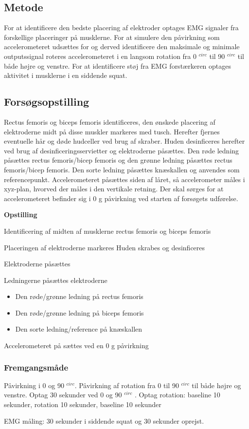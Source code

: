\subsection{Metode}
\begin{itemize}
For at identificere den bedste placering af elektroder optages EMG signaler fra forskellige placeringer på musklerne. 
For at simulere den påvirkning som accelerometeret udsættes for og derved identificere den maksimale og minimale outputssignal roteres accelerometeret i en langsom rotation fra 0 $^{circ}$ til 90 $^{circ}$  til både højre og venstre.
For at identificere støj fra EMG forstærkeren optages aktivitet i musklerne i en siddende squat.
 
\end{itemize}
\subsection{Forsøgsopstilling}
Rectus femoris og biceps femoris identificeres, den ønskede placering af elektroderne midt på disse muskler markeres med tusch. Herefter fjernes eventuelle hår og døde hudceller ved brug af skraber. Huden desinficeres herefter ved brug af desinficeringsservietter og elektroderne påsættes. Den røde ledning påsættes rectus femoris/bicep femoris og den grønne ledning påsættes rectus femoris/bicep femoris. Den sorte ledning påsættes knæskallen og anvendes som referencepunkt. Accelerometeret påsættes siden af låret, så accelerometer måles i xyz-plan, hvorved der måles i den vertikale retning. Der skal sørges for at accelerometeret befinder sig i 0 g påvirkning ved starten af forsøgets udførelse. 

\textbf{Opstilling}
\item Identificering af midten af musklerne rectus femoris og biceps femoris 
\item Placeringen af elektroderne markeres
 Huden skrabes og desinficeres
\item Elektroderne påsættes
\item Ledningerne påsættes elektroderne
\begin{itemize}
\item Den røde/grønne ledning på rectus femoris
\item Den røde/grønne ledning på biceps femoris
\item Den sorte ledning/reference på knæskallen 
\end{itemize} 
\item Accelerometeret på sættes ved en 0 g påvirkning


\subsubsection{Fremgangsmåde}
Påvirkning i 0 og 90 $^{circ}$.
Påvirkning af rotation fra 0 til 90 $^{circ}$ til både højre og venstre.
Optag 30 sekunder ved 0 og 90 $^{circ}$ .
Optag rotation: baseline 10 sekunder, rotation 10 sekunder, baseline 10 sekunder

EMG måling: 30 sekunder i siddende squat og 30 sekunder oprejst.

